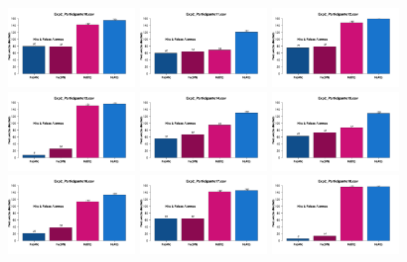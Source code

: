 \documentclass[a4paper ]{article}
\begin{document}
\begin{figure}[th]
\includegraphics[width=0.3\textwidth]{Figures/MirrorRate_Exp2_P10} \includegraphics[width=0.3\textwidth]{Figures/MirrorRate_Exp2_P11} \includegraphics[width=0.3\textwidth]{Figures/MirrorRate_Exp2_P12}
\includegraphics[width=0.3\textwidth]{Figures/MirrorRate_Exp2_P13} \includegraphics[width=0.3\textwidth]{Figures/MirrorRate_Exp2_P14} \includegraphics[width=0.3\textwidth]{Figures/MirrorRate_Exp2_P15}
\includegraphics[width=0.3\textwidth]{Figures/MirrorRate_Exp2_P16} \includegraphics[width=0.3\textwidth]{Figures/MirrorRate_Exp2_P17} \includegraphics[width=0.3\textwidth]{Figures/MirrorRate_Exp2_P18}

\end{figure}
\end{document}

